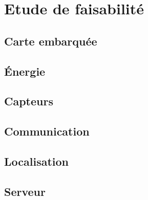 \section{Etude de faisabilité}

\subsection{Carte embarquée}

\subsection{Énergie}

\subsection{Capteurs}

\subsection{Communication}

\subsection{Localisation}

\subsection{Serveur}
